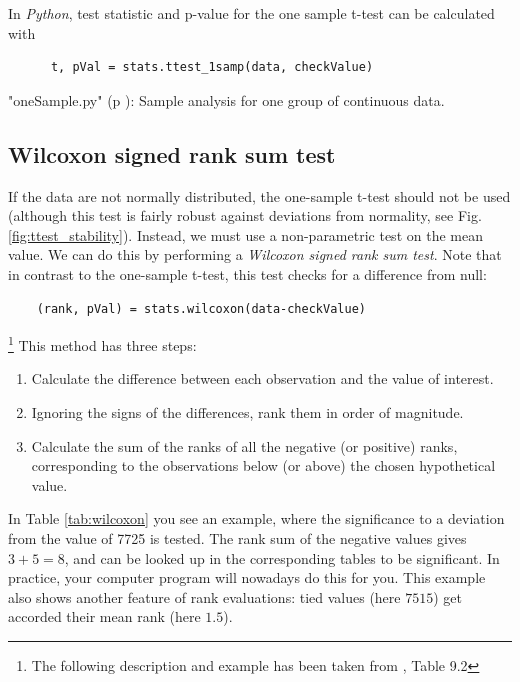 In \emph{Python}, test statistic and p-value for the one sample t-test can be calculated with

\begin{lstlisting}
      t, pVal = stats.ttest_1samp(data, checkValue)
\end{lstlisting}

\PyImg "oneSample.py" (p \pageref{py:oneSample}): Sample analysis for one group of continuous data.

\subsection{Wilcoxon signed rank sum test}

If the data are not normally distributed, the one-sample t-test should not be used (although this test is fairly robust against deviations from normality, see Fig. \ref{fig:ttest_stability}). Instead, we must use a non-parametric test on the mean value. We can do this by performing a \emph{Wilcoxon signed rank sum test}. Note that in contrast to the one-sample t-test, this test checks for a difference from null:

\begin{lstlisting}
    (rank, pVal) = stats.wilcoxon(data-checkValue)
\end{lstlisting}

\footnote{The following description and example has been taken from \cite{altman99}, Table 9.2}
This method has three steps:

\begin{enumerate}
  \item Calculate the difference between each observation and the value of interest.
  \item Ignoring the signs of the differences, rank them in order of magnitude.
  \item Calculate the sum of the ranks of all the negative (or positive) ranks, corresponding to the observations below (or above) the chosen hypothetical value.
\end{enumerate}

In Table \ref{tab:wilcoxon} you see an example, where the significance to a deviation from the value of 7725 is tested. The rank sum of the negative values gives $3+5=8$, and can be looked up in the corresponding tables to be significant. In practice, your computer program will nowadays do this for you. This example also shows another feature of rank evaluations: tied values (here $7515$) get accorded their mean rank (here $1.5$).

